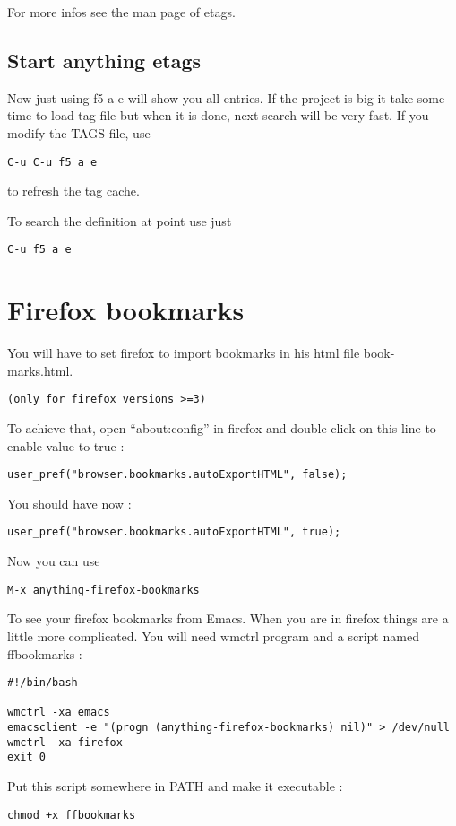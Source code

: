 \documentclass[a4paper,11pt]{article}
\begin{document}
For more infos see the man page of etags.

\subsection{Start anything etags}
\label{sec:start-anything-etags}


Now just using f5 a e will show you all entries.
If the project is big it take some time to load tag file but when it is done, next search will be very fast.
If you modify the TAGS file, use
\begin{verbatim}
C-u C-u f5 a e
\end{verbatim}
to refresh the tag cache.

To search the definition at point use just
\begin{verbatim}
C-u f5 a e
\end{verbatim}

\section{Firefox bookmarks}
\label{sec:firefox-bookmarks}

You will have to set firefox to import bookmarks in his html file book-marks.html. 
\begin{verbatim}
(only for firefox versions >=3)
\end{verbatim}
To achieve that, open ``about:config'' in firefox and double click on this line to enable value to true :
\begin{verbatim}
user_pref("browser.bookmarks.autoExportHTML", false);
\end{verbatim}
You should have now :
\begin{verbatim}
user_pref("browser.bookmarks.autoExportHTML", true);
\end{verbatim}
Now you can use
\begin{verbatim}
M-x anything-firefox-bookmarks
\end{verbatim}
To see your firefox bookmarks from Emacs.
When you are in firefox things are a little more complicated. You will
need wmctrl program and a script named ffbookmarks :
\begin{verbatim}
#!/bin/bash

wmctrl -xa emacs
emacsclient -e "(progn (anything-firefox-bookmarks) nil)" > /dev/null
wmctrl -xa firefox
exit 0
\end{verbatim}
Put this script somewhere in PATH and make it executable :
\begin{verbatim}
chmod +x ffbookmarks
\end{verbatim}
\end{document}
